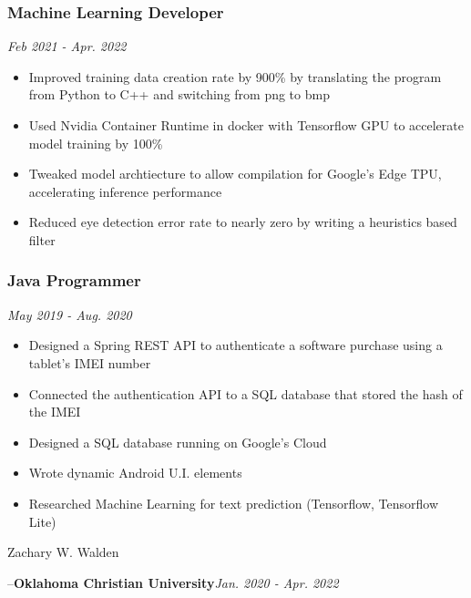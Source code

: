 \documentclass{article}
\newcommand{\companyHeader}[2]{--\large{\bfseries{#1}}\hfill \small{\textsl{#2}}}
\begin{document}
\begin{spacing}{.5}
		\subsubsection{Machine Learning Developer} \hfill \small{\textsl{Feb 2021 - Apr. 2022}}
			\begin{itemize}[label=--,itemsep=-.35ex]
				\item \large{Improved training data creation rate by 900\% by translating the program from Python to C++ and switching from png to bmp}
				\item \large{Used Nvidia Container Runtime in docker with Tensorflow GPU to accelerate model training by 100\%}
				\item \large{Tweaked model archtiecture to allow compilation for Google's Edge TPU, accelerating inference performance}
				\item \large{Reduced eye detection error rate to nearly zero by writing a heuristics based filter}
			\end{itemize}
		\subsubsection{\large{Java Programmer}} \hfill \small{\textsl{May 2019 - Aug. 2020}}
			\begin{itemize}[label=--,itemsep=-.35ex]
				\item \large{Designed a Spring REST API to authenticate a software purchase using a tablet's IMEI number}
				\item \large{Connected the authentication API to a SQL database that stored the hash of the IMEI}
				\item \large{Designed a SQL database running on Google's Cloud}
				\item \large{Wrote dynamic Android U.I. elements}
				\item \large{Researched Machine Learning for text prediction} \small{(Tensorflow, Tensorflow Lite)}
			\end{itemize}

\newpage

\begin{center}
	\begin{huge}
		Zachary W. Walden\\
	\end{huge}
\end{center}

	\companyHeader{Oklahoma Christian University}{Jan. 2020 - Apr. 2022}

\end{spacing}
\end{document}
